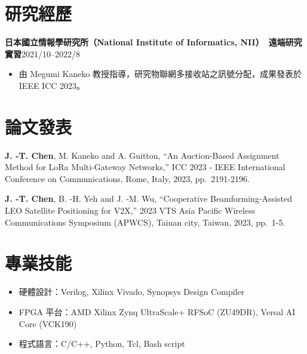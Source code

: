 \documentclass[11pt,fontset=none]{ctexart}
\newcommand{\entry}[2]{\noindent\textbf{#1}\hfill #2\par}
\begin{document}
\section{研究經歷}

\entry{日本國立情報學研究所（National Institute of Informatics, NII）\ 遠端研究實習}{2021/10--2022/8}
\begin{itemize}
  \item 由 Megumi Kaneko 教授指導，研究物聯網多接收站之訊號分配，成果發表於 IEEE ICC 2023。
\end{itemize}

\section{論文發表}

\begin{enumerate}[label={[\arabic*]}, leftmargin=2.2em]
  \item \textbf{J. -T. Chen}, M. Kaneko and A. Guitton, ``An Auction-Based
    Assignment Method for LoRa Multi-Gateway Networks,'' ICC 2023 - IEEE
    International Conference on Communications, Rome, Italy, 2023,
    pp.~2191-2196.
  \item \textbf{J. -T. Chen}, B. -H. Yeh and J. -M. Wu, ``Cooperative
    Beamforming-Assisted LEO Satellite Positioning for V2X,'' 2023 VTS Asia
    Pacific Wireless Communications Symposium (APWCS), Tainan city, Taiwan,
    2023, pp.~1-5.
\end{enumerate}

\section{專業技能}

\begin{itemize}
  \item 硬體設計：Verilog, Xilinx Vivado, Synopsys Design Compiler
  \item FPGA 平台：AMD Xilinx Zynq UltraScale+ RFSoC (ZU49DR), Versal AI Core (VCK190)
  \item 程式語言：C/C++, Python, Tcl, Bash script
\end{itemize}
\end{document}
